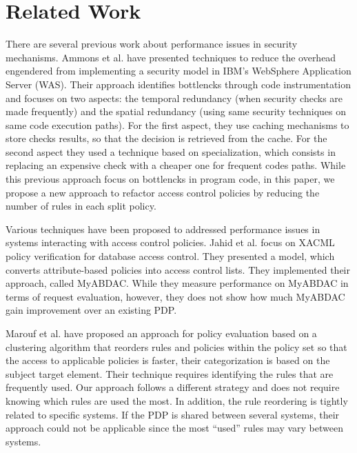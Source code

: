 \section{Related Work} \label{sec:related}

There are several previous work about performance issues in security mechanisms.
Ammons et al.\cite{largesystems} have presented techniques to reduce the overhead engendered from implementing a security model 
in IBM's WebSphere Application Server (WAS). Their approach identifies bottlencks through code instrumentation and focuses on two aspects: the temporal redundancy (when security checks are made frequently) and the spatial redundancy
(using same security techniques on same code execution paths).
For the first aspect, they use caching mechanisms to store checks results, so that the decision is retrieved from the cache.
For the second aspect they used a technique based on specialization, which consists in replacing an expensive check with a cheaper one for frequent codes paths.
While this previous approach focus on bottlencks in program code, in this paper, we propose a new
approach to refactor access control policies by reducing the number of rules in each split policy.



Various techniques \cite{MyABDAC, clustering, decomposition} have been proposed to addressed performance issues in systems interacting with access control policies.
Jahid et al. \cite{MyABDAC} focus on XACML
policy verification for database access control. They presented a model, which converts attribute-based policies into access control lists. They implemented their approach, called MyABDAC.
While they measure performance on MyABDAC in terms of request evaluation, however, they does not show how much MyABDAC
gain improvement over an existing PDP.


Marouf et al. \cite{clustering} have proposed an approach for policy evaluation based on a 
clustering algorithm that reorders rules and policies within the policy set so that the access to applicable policies is faster, their categorization is based on
 the subject target element. Their technique requires identifying the rules that are frequently used. Our approach follows a different strategy and does not require knowing which 
rules are used the most. In addition, the rule reordering is tightly related to specific systems. If the PDP is shared between several
 systems, their approach could not be applicable since the most ``used'' rules may vary between systems. \\


